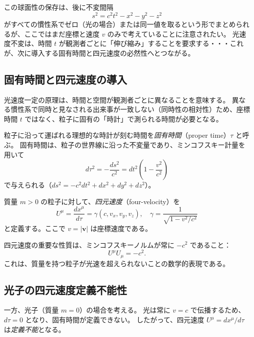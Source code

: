 \documentclass[dvipdfmx,a4paper]{jsbook}
\theoremstyle{definition}
\theoremstyle{remark}
\begin{document}
この球面性の保存は、後に不変間隔
\begin{equation}
  s^2 = c^2 t^2 - x^2 - y^2 - z^2
  \label{eq:invariant-interval-pre}
\end{equation}
がすべての慣性系でゼロ（光の場合）または同一値を取るという形でまとめられるが、ここではまだ座標と速度 $v$ のみで考えていることに注意されたい。  
光速度不変は、時間 $t$ が観測者ごとに「伸び縮み」することを要求する・・・これが、次に導入する固有時間と四元速度の必然性へとつながる。

\subsection{固有時間と四元速度の導入}

光速度一定の原理は、時間と空間が観測者ごとに異なることを意味する。  
異なる慣性系で同時と見なされる出来事が一致しない（同時性の相対性）ため、座標時間 $t$ ではなく、粒子に固有の「時計」で測られる時間が必要となる。

粒子に沿って運ばれる理想的な時計が刻む時間を\emph{固有時間}（proper time）$\tau$ と呼ぶ。  
固有時間は、粒子の世界線に沿った不変量であり、ミンコフスキー計量を用いて
\begin{equation}
  d\tau^2 = - \frac{ds^2}{c^2} = dt^2 \left(1 - \frac{v^2}{c^2}\right)
\end{equation}
で与えられる（$ds^2 = -c^2 dt^2 + dx^2 + dy^2 + dz^2$）。

質量 $m > 0$ の粒子に対して、\emph{四元速度}（four-velocity）を
\begin{equation}
  U^\mu = \frac{dx^\mu}{d\tau} = \gamma \left(c, v_x, v_y, v_z\right), \quad \gamma = \frac{1}{\sqrt{1 - v^2/c^2}}
  \label{eq:four-velocity}
\end{equation}
と定義する。ここで $v = |\mathbf{v}|$ は座標速度である。

四元速度の重要な性質は、ミンコフスキーノルムが常に $-c^2$ であること：
\begin{equation}
  U^\mu U_\mu = -c^2.
\end{equation}
これは、質量を持つ粒子が光速を超えられないことの数学的表現である。

\subsection{光子の四元速度定義不能性}

一方、光子（質量 $m=0$）の場合を考える。  
光は常に $v = c$ で伝播するため、$d\tau = 0$ となり、固有時間が定義できない。  
したがって、四元速度 $U^\mu = dx^\mu / d\tau$ は\emph{定義不能}となる。  
\end{document}
